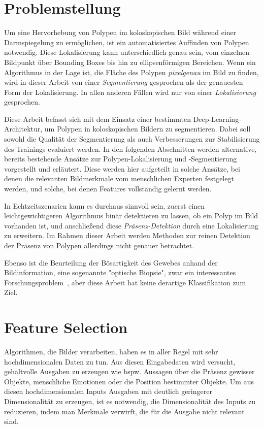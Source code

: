 \section{Problemstellung}

Um eine Hervorhebung von Polypen im koloskopischen Bild während einer Darmspiegelung zu ermöglichen, ist ein automatisiertes Auffinden von Polypen notwendig.
Diese Lokalisierung kann unterschiedlich genau sein, vom einzelnen Bildpunkt über Bounding Boxes bis hin zu ellipsenförmigen Bereichen.
Wenn ein Algorithmus in der Lage ist, die Fläche des Polypen \emph{pixelgenau} im Bild zu finden, wird in dieser Arbeit von einer \emph{Segmentierung} gesprochen als der genauesten Form der Lokalisierung.
In allen anderen Fällen wird nur von einer \emph{Lokalisierung} gesprochen.

Diese Arbeit befasst sich mit dem Einsatz einer bestimmten Deep-Learning-Architektur, um Polypen in koloskopischen Bildern zu segmentieren.
Dabei soll sowohl die Qualität der Segmentierung als auch Verbesserungen zur Stabilisierung des Trainings evaluiert werden.
In den folgenden Abschnitten werden alternative, bereits bestehende Ansätze zur Polypen-Lokalisierung und -Segmentierung vorgestellt und erläutert.
Diese werden hier aufgeteilt in solche Ansätze, bei denen die relevanten Bildmerkmale vom menschlichen Experten festgelegt werden, und solche, bei denen Features vollständig gelernt werden.

In Echtzeitszenarien kann es durchaus sinnvoll sein, zuerst einen leichtgewichtigeren Algorithmus binär detektieren zu lassen, ob ein Polyp im Bild vorhanden ist, und anschließend diese \emph{Präsenz-Detektion} durch eine Lokalisierung zu erweitern.
Im Rahmen dieser Arbeit werden Methoden zur reinen Detektion der Präsenz von Polypen allerdings nicht genauer betrachtet.

Ebenso ist die Beurteilung der Bösartigkeit des Gewebes anhand der Bildinformation, eine sogenannte "optische Biopsie", zwar ein interessantes Forschungsproblem~\cite{Roy.2011}, aber diese Arbeit hat keine derartige Klassifikation zum Ziel.



\section{Feature Selection}

Algorithmen, die Bilder verarbeiten, haben es in aller Regel mit sehr hochdimensionalen Daten zu tun.
Aus diesen Eingabedaten wird versucht, gehaltvolle Ausgaben zu erzeugen wie bspw. Aussagen über die Präsenz gewisser Objekte, menschliche Emotionen oder die Position bestimmter Objekte.
Um aus diesen hochdimensionalen Inputs Ausgaben mit deutlich geringerer Dimensionalität zu erzeugen, ist es notwendig, die Dimensionalität des Inputs zu reduzieren, indem man Merkmale verwirft, die für die Ausgabe nicht relevant sind.

